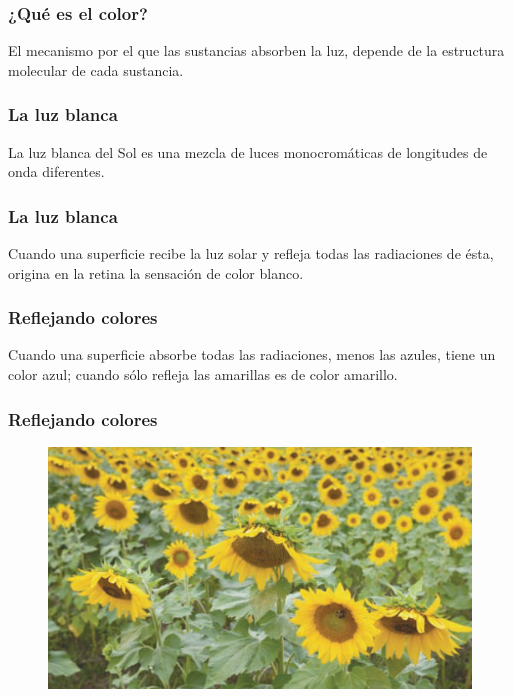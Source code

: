 \documentclass[14pt]{beamer}
\begin{document}
\begin{frame}
\frametitle{¿Qué es el color?}
El mecanismo por el que las sustancias absorben la luz, depende de la estructura molecular de cada sustancia.
\end{frame}
\begin{frame}
\frametitle{La luz blanca}
La luz blanca del Sol es una mezcla de luces monocromáticas de longitudes de onda diferentes.
\end{frame}
\begin{frame}
\frametitle{La luz blanca}
Cuando una superficie recibe la luz solar y refleja todas las radiaciones de ésta, origina en la retina la sensación de color blanco.
\end{frame}
\begin{frame}
\frametitle{Reflejando colores}
Cuando una superficie absorbe todas las radiaciones, menos las azules, tiene un color azul; \pause cuando
sólo refleja las amarillas es de color amarillo.
\end{frame}
\begin{frame}
\frametitle{Reflejando colores}
\begin{figure}
    \centering
    \includegraphics[scale=0.6]{Imagenes/Color_02.png}
\end{figure}
\end{frame}
\end{document}
